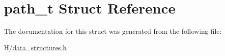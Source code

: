 \hypertarget{structpath__t}{
\section{path\_\-t Struct Reference}
\label{structpath__t}
}


The documentation for this struct was generated from the following file:\begin{DoxyCompactItemize}
\item 
H/\hyperlink{data__structures_8h}{data\_\-structures.h}\end{DoxyCompactItemize}
